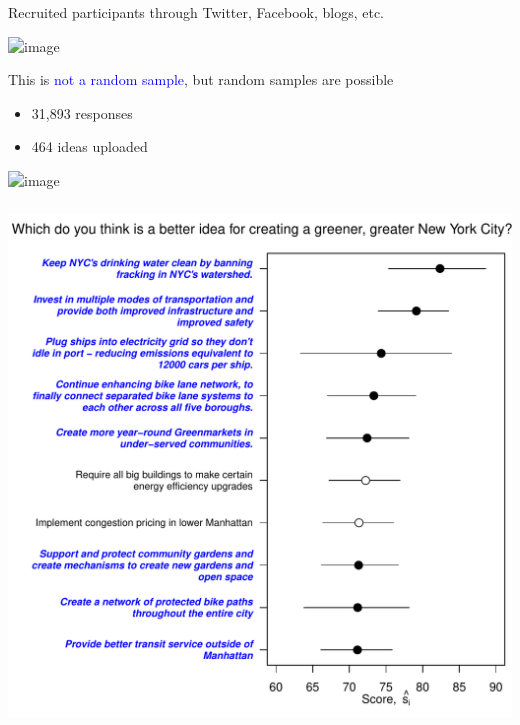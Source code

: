 \documentclass[aspectratio=169]{beamer}
\begin{document}
\begin{frame}
\frametitle{}

Recruited participants through Twitter, Facebook, blogs, etc. 
\begin{center}
\includegraphics<1>[width=\textwidth]{figures/planyc_tweet}
\end{center}

This is \textcolor{blue}{not a random sample}, but random samples are possible
\end{frame}
\begin{frame}

\begin{itemize}
\item 31,893 responses
\item 464 ideas uploaded 
\end{itemize}

\begin{center}
\includegraphics<1>[width=0.7\textheight]{figures/planyc_user_activity_responses}
\end{center}

\end{frame}
\begin{frame}
\frametitle{}

\begin{center}
\includegraphics[width=0.96\textheight]{figures/planyc_sigma1_top10_blue}
\end{center}

\end{frame}
\end{document}
